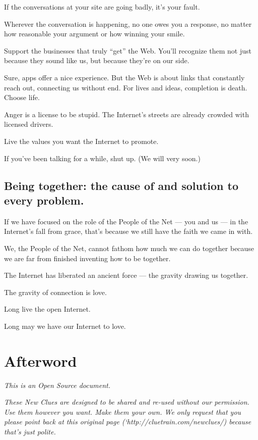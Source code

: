 \documentclass[letterpaper,12pt,english]{sphinxmanual}
\begin{document}
If the conversations at your site are going badly, it's your fault.

Wherever the conversation is happening, no one owes you a response, no matter how reasonable your argument or how winning your smile.

Support the businesses that truly ``get'' the Web. You'll recognize them not just because they sound like us, but because they're on our side.

Sure, apps offer a nice experience. But the Web is about links that constantly reach out, connecting us without end. For lives and ideas, completion is death. Choose life.

Anger is a license to be stupid. The Internet's streets are already crowded with licensed drivers.

Live the values you want the Internet to promote.

If you've been talking for a while, shut up. (We will very soon.)


\subsection{Being together: the cause of and solution to every problem.}
\label{2015newclues:being-together-the-cause-of-and-solution-to-every-problem}
If we have focused on the role of the People of the Net  — you and us — in the Internet's fall from grace, that's because we still have the faith we came in with.

We, the People of the Net, cannot fathom how much we can do together because we are far from finished inventing how to be together.

The Internet has liberated an ancient force — the gravity drawing us together.

The gravity of connection is love.

Long live the open Internet.

Long may we have our Internet to love.


\section{Afterword}
\label{2015newclues:afterword}
\emph{This is an Open Source document.}

\emph{These New Clues are designed to be shared and re-used without our permission. Use them however you want. Make them your own. We only request that you please point back at this original page ({}`http://cluetrain.com/newclues/) because that's just polite.}
\end{document}
